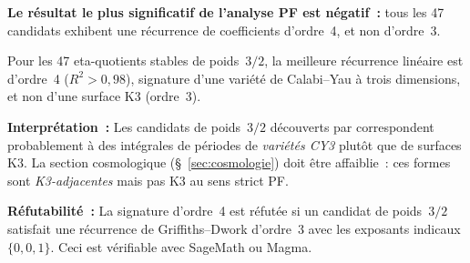 \textbf{Le résultat le plus significatif de l'analyse PF est négatif~:} tous les 47 candidats exhibent une récurrence de coefficients d'ordre~4, et non d'ordre~3.

\begin{proposition}
Pour les 47 eta-quotients stables de poids~$3/2$, la meilleure récurrence linéaire est d'ordre~4 ($R^2 > 0{,}98$), signature d'une variété de Calabi--Yau à trois dimensions, et non d'une surface K3 (ordre~3).
\end{proposition}

\textbf{Interprétation~:} Les candidats de poids~$3/2$ découverts par \RAMA{} correspondent probablement à des intégrales de périodes de \emph{variétés CY3} plutôt que de surfaces K3. La section cosmologique (§~\ref{sec:cosmologie}) doit être affaiblie~: ces formes sont \emph{K3-adjacentes} mais pas K3 au sens strict PF.

\textbf{Réfutabilité~:} La signature d'ordre~4 est réfutée si un candidat de poids~$3/2$ satisfait une récurrence de Griffiths--Dwork d'ordre~3 avec les exposants indicaux $\{0, 0, 1\}$. Ceci est vérifiable avec SageMath ou Magma.
